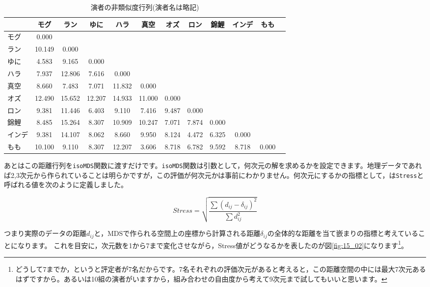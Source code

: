 \documentclass{ltjsbook}
\begin{document}
\begin{table}[ht]
	\centering
	\caption{演者の非類似度行列(演者名は略記)}
	\begin{tabular}{l|ccccccccccc}
		\hline
		    & モグ     & ラン     & ゆに     & ハラ     & 真空     & オズ    & ロン    & 錦鯉    & インデ   & もも    \\
		\hline
		モグ  & 0.000  &        &        &        &        &       &       &       &       &       \\
		ラン  & 10.149 & 0.000  &        &        &        &       &       &       &       &       \\
		ゆに  & 4.583  & 9.165  & 0.000  &        &        &       &       &       &       &       \\
		ハラ  & 7.937  & 12.806 & 7.616  & 0.000  &        &       &       &       &       &       \\
		真空  & 8.660  & 7.483  & 7.071  & 11.832 & 0.000  &       &       &       &       &       \\
		オズ  & 12.490 & 15.652 & 12.207 & 14.933 & 11.000 & 0.000 &       &       &       &       \\
		ロン  & 9.381  & 11.446 & 6.403  & 9.110  & 7.416  & 9.487 & 0.000 &       &       &       \\
		錦鯉  & 8.485  & 15.264 & 8.307  & 10.909 & 10.247 & 7.071 & 7.874 & 0.000 &       &       \\
		インデ & 9.381  & 14.107 & 8.062  & 8.660  & 9.950  & 8.124 & 4.472 & 6.325 & 0.000 &       \\
		もも  & 10.100 & 9.110  & 8.307  & 12.207 & 3.606  & 8.718 & 6.782 & 9.592 & 8.718 & 0.000 \\
		\hline
	\end{tabular}
	\label{tbl:15_04}
\end{table}
あとはこの距離行列を\verb|isoMDS|関数に渡すだけです。\verb|isoMDS|関数は引数として，何次元の解を求めるかを設定できます。地理データであれば2,3次元から作られていることは明らかですが，この評価が何次元かは事前にわかりません。何次元にするかの指標として，\textcite{kruskal1964}は\verb|Stress|と呼ばれる値を次のように定義しました。

\[ Stress = \sqrt{\frac{\sum(d_{ij} - \delta_{ij})^2}{\sum d_{ij}^2}} \]

つまり実際のデータの距離$d_{ij}$と，MDSで作られる空間上の座標から計算される距離$\delta_{ij}$の全体的な距離を当て嵌まりの指標と考えていることになります。
これを目安に，次元数を1から7まで変化させながら，Stress値がどうなるかを表したのが図\ref{fig:15_02}になります\footnote{どうして7までか，というと評定者が7名だからです。7名それぞれの評価次元があると考えると，この距離空間の中には最大7次元あるはずですから。あるいは10組の演者がいますから，組み合わせの自由度から考えて9次元まで試してもいいと思います。}。
\end{document}
